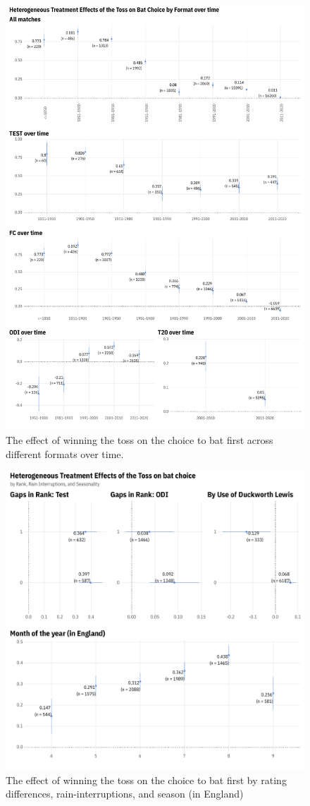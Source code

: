 \documentclass[12pt, letterpaper]{article}
\begin{document}
\begin{figure}
 \centering
 \includegraphics[scale=.45]{output/first_stage_by_format_overtime.pdf}
 \caption{The effect of winning the toss on the choice to bat first across different formats over time.}
 \label{fig:fs_het_TE2}
\end{figure}

\clearpage

\begin{figure}
 \centering
 \includegraphics[scale=.5]{output/first_stage_by_rank_dl_season.pdf}
 \caption{The effect of winning the toss on the choice to bat first by rating differences, rain-interruptions, and season (in England)}
 \label{fig:fs_het_TE3}
\end{figure}
\end{document}
